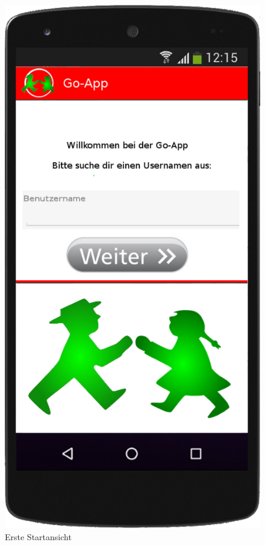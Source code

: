 \begin{figure}
\caption{Erste Startansicht}
\includegraphics[scale = 0.2]{resources/images/handy/startansicht.png}
\end{figure}


